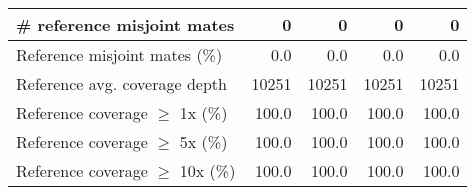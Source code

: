 \documentclass[12pt,a4paper]{article}
\begin{document}
\begin{table}[ht]
\begin{center}
\begin{tabular}{|l*{4}{|r}|}
\# reference misjoint mates & 0 & 0 & 0 & 0 \\ \hline
Reference misjoint mates (\%) & 0.0 & 0.0 & 0.0 & 0.0 \\ \hline
Reference avg. coverage depth & 10251 & 10251 & 10251 & 10251 \\ \hline
Reference coverage $\geq$ 1x (\%) & 100.0 & 100.0 & 100.0 & 100.0 \\ \hline
Reference coverage $\geq$ 5x (\%) & 100.0 & 100.0 & 100.0 & 100.0 \\ \hline
Reference coverage $\geq$ 10x (\%) & 100.0 & 100.0 & 100.0 & 100.0 \\ \hline
\end{tabular}
\end{center}
\end{table}
\end{document}
